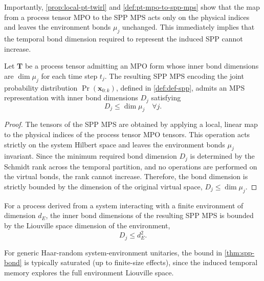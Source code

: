 Importantly, \cref{prop:local-pt-twirl} and \cref{def:pt-mpo-to-spp-mps} show that the map from a process tensor MPO to the SPP MPS acts only on the physical indices and leaves the environment bonds \(\mu_j\) unchanged. This immediately implies that the temporal bond dimension required to represent the induced SPP cannot increase.
\begin{lemma}\label{thm:spp-bond}
  Let \(\mathbf{T}\) be a process tensor admitting an MPO form whose inner bond dimensions are \(\dim \mu_j\) for each time step \(t_j\). The resulting SPP MPS encoding the joint probability distribution \(\Pr(\mathbf{x}_{0:k})\), defined in \cref{def:def-spp}, admits an MPS representation with inner bond dimensions \(D_j\) satisfying 
  \begin{equation}
    D_j \leq \dim \mu_j \quad \forall j.
  \end{equation}
\end{lemma}
\begin{proof}
    The tensors of the SPP MPS are obtained by applying a local, linear map to the physical indices of the process tensor MPO tensors. This operation acts strictly on the system Hilbert space and leaves the environment bonds \(\mu_j\) invariant. Since the minimum required bond dimension \(D_j\) is determined by the Schmidt rank across the temporal partition, and no operations are performed on the virtual bonds, the rank cannot increase. Therefore, the bond dimension is strictly bounded by the dimension of the original virtual space, \(D_j \le \dim \mu_j\).
\end{proof}
\begin{corollary}\label{thm:env-bond-dim-bound}
    For a process derived from a system interacting with a finite environment of dimension \(d_E\), the inner bond dimensions of the resulting SPP MPS is bounded by the Liouville space dimension of the environment,
    \begin{equation}
        D_j \le d_E^2.
    \end{equation}
\end{corollary}
For generic Haar-random system-environment unitaries, the bound in \cref{thm:spp-bond} is typically saturated (up to finite-size effects), since the induced temporal memory explores the full environment Liouville space.

